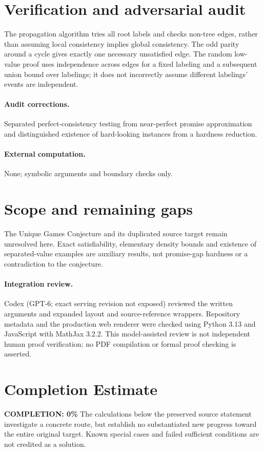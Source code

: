 \documentclass[11pt]{article}
\begin{document}
\section{Verification and adversarial audit}
The propagation algorithm tries all root labels and checks non-tree edges, rather than assuming local consistency implies global consistency. The odd parity around a cycle gives exactly one necessary unsatisfied edge. The random low-value proof uses independence across edges for a fixed labeling and a subsequent union bound over labelings; it does not incorrectly assume different labelings' events are independent.
\paragraph{Audit corrections.} Separated perfect-consistency testing from near-perfect promise approximation and distinguished existence of hard-looking instances from a hardness reduction.
\paragraph{External computation.} None; symbolic arguments and boundary checks only.
\section{Scope and remaining gaps}
The Unique Games Conjecture and its duplicated source target remain unresolved here. Exact satisfiability, elementary density bounds and existence of separated-value examples are auxiliary results, not promise-gap hardness or a contradiction to the conjecture.
\paragraph{Integration review.} Codex (GPT-6; exact serving revision not exposed) reviewed the written arguments and expanded layout and source-reference wrappers. Repository metadata and the production web renderer were checked using Python 3.13 and JavaScript with MathJax 3.2.2. This model-assisted review is not independent human proof verification; no PDF compilation or formal proof checking is asserted.

\section{Completion Estimate}
\noindent\textbf{COMPLETION: 0\%}
The calculations below the preserved source statement investigate a concrete route,
but establish no substantiated new progress toward the entire original target.
Known special cases and failed sufficient conditions are not credited as a solution.
\end{document}
